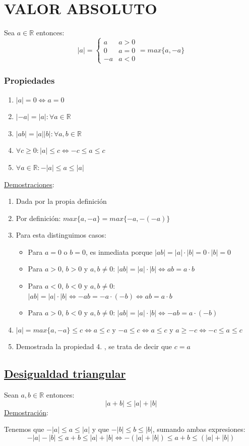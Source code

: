 \documentclass[10pt,a4paper,openright]{book}
\begin{document}
\section*{VALOR ABSOLUTO}
Sea $a\in \mathbb R$ entonces:
$$
|a|=
\begin{cases}
a & a>0 \\
0 & a=0 \\
-a & a<0
\end{cases}
=max\{a,-a\}
$$
\subsubsection*{Propiedades}
\begin{enumerate}
\item $|a|=0\Leftrightarrow a=0$
\item $|-a|=|a|: \forall a \in \mathbb R$
\item $|ab|=|a||b|: \forall a,b\in \mathbb R$
\item $\forall c\geq 0: |a|\leq c \Leftrightarrow -c\leq a\leq c$
\item $\forall a \in \mathbb R: -|a|\leq a\leq |a|$
\end{enumerate}
\underline{Demostraciones}:
\begin{enumerate}
\item Dada por la propia definición
\item Por definición: $max\{a,-a\}=max\{-a,-(-a)\}$
\item Para esta distinguimos casos:
	\begin{itemize}
	\item Para $a=0$ o $b=0$, es inmediata porque $|ab|=|a|\cdot |b|=0\cdot |b|=0$
	\item Para $a>0$, $b>0$ y $a,b\neq 0$: $|ab|=|a|\cdot |b|\Leftrightarrow ab=a\cdot b$
	\item Para $a<0$, $b<0$ y $a,b\neq 0$:$|ab|=|a|\cdot |b|\Leftrightarrow -ab=-a\cdot (-b)\Leftrightarrow ab=a\cdot b$
	\item Para $a>0$, $b<0$ y $a,b\neq 0$: $|ab|=|a|\cdot |b|\Leftrightarrow -ab=a\cdot(-b)$
	\end{itemize}

\item $|a|=max\{a,-a\}\leq c\Leftrightarrow a\leq c$ y $-a\leq c\Leftrightarrow a\leq c$ y $a\geq -c\Leftrightarrow -c\leq a\leq c$
\item Demostrada la propiedad 4. , se trata de decir que $c=a$
\end{enumerate}

\subsection*{\underline{Desigualdad triangular}}
Sean $a,b\in \mathbb R$ entonces:
$$|a+b|\leq|a|+|b|$$
\underline{Demostración}:\par
Tenemos que $-|a|\leq a\leq |a|$ y que $-|b|\leq b\leq |b|$, sumando ambas expresiones:
$$-|a|-|b|\leq a+b\leq |a|+|b|\Leftrightarrow -(|a|+|b|)\leq a+b\leq (|a|+|b|)$$
\end{document}
